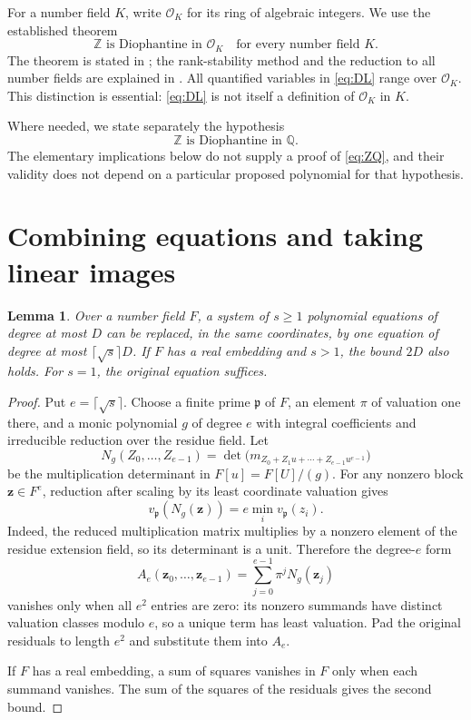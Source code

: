 \documentclass[11pt,a4paper]{article}
\newtheorem{lemma}[theorem]{Lemma}
\theoremstyle{definition}
\newcommand{\Q}{\mathbb Q}
\newcommand{\Z}{\mathbb Z}
\newcommand{\OK}{\mathcal O_K}
\begin{document}
For a number field $K$, write $\OK$ for its ring of algebraic
integers. We use the established theorem
\begin{equation}\label{eq:DL}
            \Z\text{ is Diophantine in }\OK
            \quad\text{for every number field }K.
\end{equation}
The theorem is stated in \cite[Corollary 1.2]{ABHS}; the
rank-stability method and the reduction to all number fields are
explained in \cite[Sections 1.2 and 5]{Poonen}.
All quantified variables in \eqref{eq:DL} range over $\OK$.
This distinction is essential: \eqref{eq:DL} is not itself a
definition of $\OK$ in $K$.

Where needed, we state separately the hypothesis
\begin{equation}\label{eq:ZQ}
                    \Z\text{ is Diophantine in }\Q.
                    \tag{H}
\end{equation}
The elementary implications below do not supply a proof of
\eqref{eq:ZQ}, and their validity does not depend on a particular
proposed polynomial for that hypothesis.

\section{Combining equations and taking linear images}

\begin{lemma}\label{lem:combine}
Over a number field $F$, a system of $s\ge1$ polynomial equations of
degree at most $D$ can be replaced, in the same coordinates, by one
equation of degree at most $\lceil\sqrt{s}\rceil D$.
If $F$ has a real embedding and $s>1$, the bound $2D$ also holds.
For $s=1$, the original equation suffices.
\end{lemma}
\begin{proof}
Put $e=\lceil\sqrt{s}\rceil$. Choose a finite prime $\mathfrak p$
of $F$, an element $\pi$ of valuation one there, and a monic
polynomial $g$ of degree $e$ with integral coefficients and
irreducible reduction over the residue field. Let
\[
 N_g(Z_0,\ldots,Z_{e-1})
  =\det\bigl(m_{Z_0+Z_1u+\cdots+Z_{e-1}u^{e-1}}\bigr)
\]
be the multiplication determinant in $F[u]=F[U]/(g)$.
For any nonzero block $\mathbf z\in F^e$, reduction after scaling
by its least coordinate valuation gives
\[
        v_{\mathfrak p}(N_g(\mathbf z))
                      =e\min_i v_{\mathfrak p}(z_i).
\]
Indeed, the reduced multiplication matrix multiplies by a nonzero
element of the residue extension field, so its determinant is a
unit. Therefore the degree-$e$ form
\[
       A_e(\mathbf z_0,\ldots,\mathbf z_{e-1})
                    =\sum_{j=0}^{e-1}\pi^jN_g(\mathbf z_j)
\]
vanishes only when all $e^2$ entries are zero: its nonzero summands
have distinct valuation classes modulo $e$, so a unique term has
least valuation. Pad the original residuals to length $e^2$ and
substitute them into $A_e$.

If $F$ has a real embedding, a sum of squares vanishes in $F$
only when each summand vanishes. The sum of the squares of the
residuals gives the second bound.
\end{proof}
\end{document}
